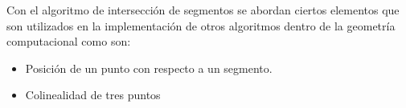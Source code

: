Con el algoritmo de intersección de segmentos se abordan ciertos elementos que son utilizados en la implementación de otros algoritmos dentro de la geometría computacional como son: 

\begin{itemize}
	\item Posición de un punto con respecto a un segmento.
	\item Colinealidad de tres puntos
\end{itemize}